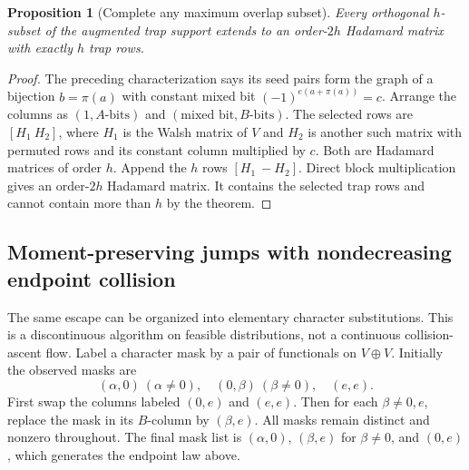 \documentclass[11pt]{article}
\newtheorem{proposition}[theorem]{Proposition}
\begin{document}
\begin{proposition}[Complete any maximum overlap subset]
\label{prop:compression-complete-clique}
Every orthogonal $h$-subset of the augmented trap support extends to an
order-$2h$ Hadamard matrix with exactly $h$ trap rows.
\end{proposition}
\begin{proof}
The preceding characterization says its seed pairs form the graph of a
bijection $b=\pi(a)$ with constant mixed bit $(-1)^{e(a+\pi(a))}=c$.
Arrange the columns as $(1,A\text{-bits})$ and
$(\text{mixed bit},B\text{-bits})$. The selected rows are
$[H_1\ H_2]$, where $H_1$ is the Walsh matrix of $V$ and $H_2$ is
another such matrix with permuted rows and its constant column multiplied
by $c$. Both are Hadamard matrices of order $h$. Append the $h$ rows
$[H_1\ -H_2]$. Direct block multiplication gives an order-$2h$ Hadamard
matrix. It contains the selected trap rows and cannot contain more than
$h$ by the theorem.
\end{proof}

\subsection{Moment-preserving jumps with nondecreasing endpoint collision}
The same escape can be organized into elementary character substitutions.
This is a discontinuous algorithm on feasible distributions, not a
continuous collision-ascent flow. Label a character mask by a pair of
functionals on $V\oplus V$. Initially the observed masks are
\[
 (\alpha,0)\ (\alpha\ne0),\quad (0,\beta)\ (\beta\ne0),\quad(e,e).
\]
First swap the columns labeled $(0,e)$ and $(e,e)$. Then for each
$\beta\ne0,e$, replace the mask in its $B$-column by $(\beta,e)$.
All masks remain distinct and nonzero throughout. The final mask list is
$(\alpha,0)$, $(\beta,e)$ for $\beta\ne0$, and $(0,e)$, which generates
the endpoint law above.
\end{document}
